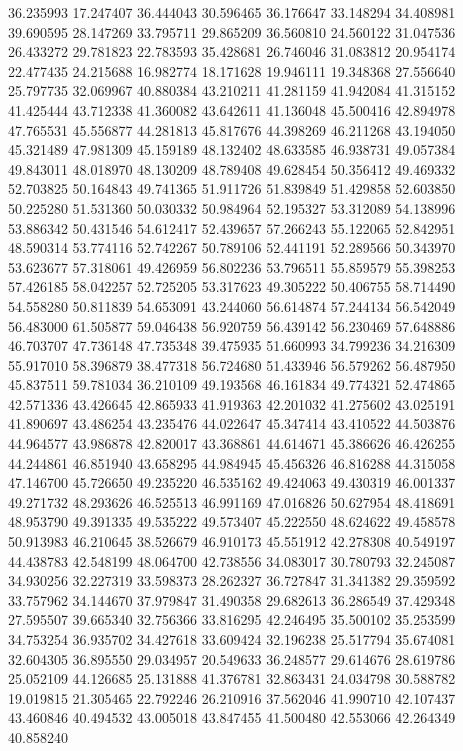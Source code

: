 36.235993
17.247407
36.444043
30.596465
36.176647
33.148294
34.408981
39.690595
28.147269
33.795711
29.865209
36.560810
24.560122
31.047536
26.433272
29.781823
22.783593
35.428681
26.746046
31.083812
20.954174
22.477435
24.215688
16.982774
18.171628
19.946111
19.348368
27.556640
25.797735
32.069967
40.880384
43.210211
41.281159
41.942084
41.315152
41.425444
43.712338
41.360082
43.642611
41.136048
45.500416
42.894978
47.765531
45.556877
44.281813
45.817676
44.398269
46.211268
43.194050
45.321489
47.981309
45.159189
48.132402
48.633585
46.938731
49.057384
49.843011
48.018970
48.130209
48.789408
49.628454
50.356412
49.469332
52.703825
50.164843
49.741365
51.911726
51.839849
51.429858
52.603850
50.225280
51.531360
50.030332
50.984964
52.195327
53.312089
54.138996
53.886342
50.431546
54.612417
52.439657
57.266243
55.122065
52.842951
48.590314
53.774116
52.742267
50.789106
52.441191
52.289566
50.343970
53.623677
57.318061
49.426959
56.802236
53.796511
55.859579
55.398253
57.426185
58.042257
52.725205
53.317623
49.305222
50.406755
58.714490
54.558280
50.811839
54.653091
43.244060
56.614874
57.244134
56.542049
56.483000
61.505877
59.046438
56.920759
56.439142
56.230469
57.648886
46.703707
47.736148
47.735348
39.475935
51.660993
34.799236
34.216309
55.917010
58.396879
38.477318
56.724680
51.433946
56.579262
56.487950
45.837511
59.781034
36.210109
49.193568
46.161834
49.774321
52.474865
42.571336
43.426645
42.865933
41.919363
42.201032
41.275602
43.025191
41.890697
43.486254
43.235476
44.022647
45.347414
43.410522
44.503876
44.964577
43.986878
42.820017
43.368861
44.614671
45.386626
46.426255
44.244861
46.851940
43.658295
44.984945
45.456326
46.816288
44.315058
47.146700
45.726650
49.235220
46.535162
49.424063
49.430319
46.001337
49.271732
48.293626
46.525513
46.991169
47.016826
50.627954
48.418691
48.953790
49.391335
49.535222
49.573407
45.222550
48.624622
49.458578
50.913983
46.210645
38.526679
46.910173
45.551912
42.278308
40.549197
44.438783
42.548199
48.064700
42.738556
34.083017
30.780793
32.245087
34.930256
32.227319
33.598373
28.262327
36.727847
31.341382
29.359592
33.757962
34.144670
37.979847
31.490358
29.682613
36.286549
37.429348
27.595507
39.665340
32.756366
33.816295
42.246495
35.500102
35.253599
34.753254
36.935702
34.427618
33.609424
32.196238
25.517794
35.674081
32.604305
36.895550
29.034957
20.549633
36.248577
29.614676
28.619786
25.052109
44.126685
25.131888
41.376781
32.863431
24.034798
30.588782
19.019815
21.305465
22.792246
26.210916
37.562046
41.990710
42.107437
43.460846
40.494532
43.005018
43.847455
41.500480
42.553066
42.264349
40.858240
